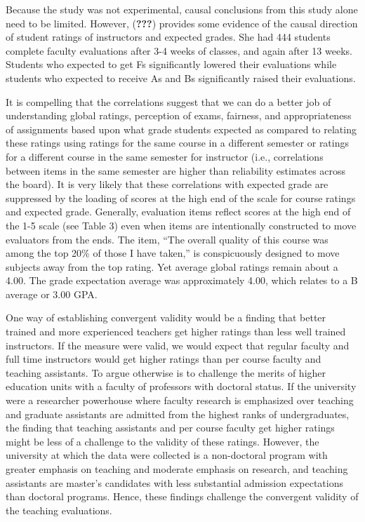 \documentclass[man]{apa6}
\theoremstyle{definition}
\theoremstyle{definition}
\theoremstyle{definition}
\theoremstyle{remark}
\begin{document}
Because the study was not experimental, causal conclusions from this
study alone need to be limited. However, ({\textbf{???}}) provides some
evidence of the causal direction of student ratings of instructors and
expected grades. She had 444 students complete faculty evaluations after
3-4 weeks of classes, and again after 13 weeks. Students who expected to
get Fs significantly lowered their evaluations while students who
expected to receive As and Bs significantly raised their evaluations.

It is compelling that the correlations suggest that we can do a better
job of understanding global ratings, perception of exams, fairness, and
appropriateness of assignments based upon what grade students expected
as compared to relating these ratings using ratings for the same course
in a different semester or ratings for a different course in the same
semester for instructor (i.e., correlations between items in the same
semester are higher than reliability estimates across the board). It is
very likely that these correlations with expected grade are suppressed
by the loading of scores at the high end of the scale for course ratings
and expected grade. Generally, evaluation items reflect scores at the
high end of the 1-5 scale (see Table 3) even when items are
intentionally constructed to move evaluators from the ends. The item,
\enquote{The overall quality of this course was among the top 20\% of
those I have taken,} is conspicuously designed to move subjects away
from the top rating. Yet average global ratings remain about a 4.00. The
grade expectation average was approximately 4.00, which relates to a B
average or 3.00 GPA.

One way of establishing convergent validity would be a finding that
better trained and more experienced teachers get higher ratings than
less well trained instructors. If the measure were valid, we would
expect that regular faculty and full time instructors would get higher
ratings than per course faculty and teaching assistants. To argue
otherwise is to challenge the merits of higher education units with a
faculty of professors with doctoral status. If the university were a
researcher powerhouse where faculty research is emphasized over teaching
and graduate assistants are admitted from the highest ranks of
undergraduates, the finding that teaching assistants and per course
faculty get higher ratings might be less of a challenge to the validity
of these ratings. However, the university at which the data were
collected is a non-doctoral program with greater emphasis on teaching
and moderate emphasis on research, and teaching assistants are master's
candidates with less substantial admission expectations than doctoral
programs. Hence, these findings challenge the convergent validity of the
teaching evaluations.
\end{document}
